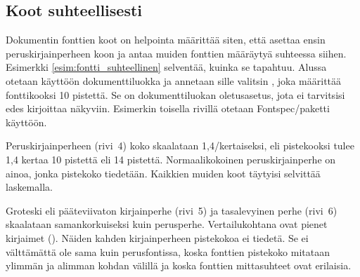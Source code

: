 
\subsection{Koot suhteellisesti}
\label{luku:fontti_suhteellinen}

Dokumentin fonttien koot on helpointa määrittää siten, että asettaa
ensin peruskirjainperheen koon ja antaa muiden fonttien määräytyä
suhteessa siihen. Esimerkki \ref{esim:fontti_suhteellinen} selventää,
kuinka se tapahtuu. Alussa otetaan käyttöön dokumenttiluokka
 ja annetaan sille valitsin \koodi{10pt}, joka määrittää
fonttikooksi 10 pistettä. Se on dokumenttiluokan ole\-tus\-ase\-tus,
jota ei tarvitsisi edes kirjoittaa näkyviin. Esimerkin toisella rivillä
otetaan Fontspec\-/paketti käyttöön.

Peruskirjainperheen (rivi~4) koko skaalataan 1,4\-/kertaiseksi, eli
pistekooksi tulee 1,4 kertaa 10 pistettä eli 14 pistettä.
Normaalikokoinen peruskirjainperhe on ainoa, jonka pistekoko tiedetään.
Kaikkien muiden koot täytyisi selvittää laskemalla.

Groteski eli pääteviivaton kirjainperhe (rivi~5) ja tasalevyinen perhe
(rivi~6) skaalataan samankorkuiseksi kuin perusperhe. Vertailukohtana
ovat pienet kirjaimet (). Näiden kahden
kirjainperheen pistekokoa ei tiedetä. Se ei välttämättä ole sama kuin
perusfontissa, koska fonttien pistekoko mitataan ylimmän ja alimman
kohdan välillä ja koska fonttien mittasuhteet ovat erilaisia.

